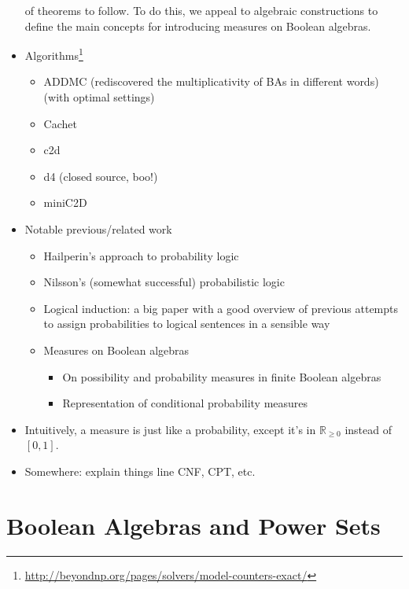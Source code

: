 \documentclass{article}
\theoremstyle{definition}
\theoremstyle{remark}
\begin{document}
\begin{itemize}
  of theorems to follow. To do this, we appeal to algebraic constructions to
  define the main concepts for introducing measures on Boolean algebras.
\item
  Algorithms\footnote{\url{http://beyondnp.org/pages/solvers/model-counters-exact/}}
  \begin{itemize}
  \item ADDMC \cite{DBLP:conf/aaai/DudekPV20} (rediscovered the
    multiplicativity of BAs in different words) (with optimal settings)
  \item Cachet \cite{DBLP:conf/sat/SangBBKP04}
  \item c2d \cite{DBLP:conf/ecai/Darwiche04}
  \item d4 \cite{DBLP:conf/ijcai/LagniezM17} (closed source, boo!)
  \item miniC2D  \cite{DBLP:conf/ijcai/OztokD15}
  \end{itemize}
\item Notable previous/related work
  \begin{itemize}
  \item Hailperin's approach to probability logic
    \cite{DBLP:journals/ndjfl/Hailperin84}
  \item Nilsson's (somewhat successful) probabilistic logic
    \cite{DBLP:journals/ai/Nilsson86,DBLP:journals/ai/Nilsson93}
  \item Logical induction: a big paper with a good overview of previous attempts
    to assign probabilities to logical sentences in a sensible way
    \cite{DBLP:journals/eccc/GarrabrantBCST16}
  \item Measures on Boolean algebras
    \begin{itemize}
    \item On possibility and probability measures in finite Boolean algebras
      \cite{DBLP:journals/soco/CastineiraCT02}
    \item Representation of conditional probability measures
      \cite{krauss1968representation}
    \end{itemize}
  \end{itemize}
\item Intuitively, a measure is just like a probability, except it's in
  $\mathbb{R}_{\ge 0}$ instead of $[0, 1]$.
\item Somewhere: explain things line CNF, CPT, etc.
\end{itemize}

\section{Boolean Algebras and Power Sets}
\end{document}
